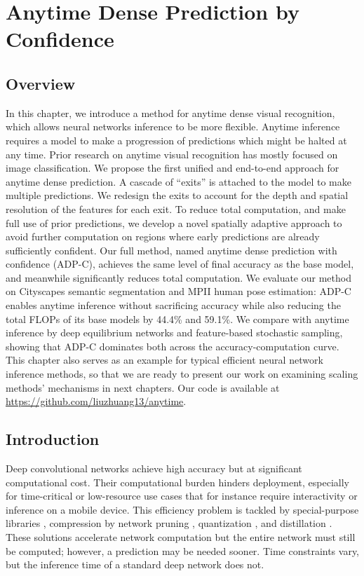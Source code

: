 \chapter{Anytime Dense Prediction by Confidence}
\label{chap:}

\section{Overview}
In this chapter, we introduce a method for anytime dense visual recognition, which allows neural networks inference to be more flexible. Anytime inference requires a model to make a progression of predictions which might be halted at any time. Prior research on anytime visual recognition has mostly focused on image classification. We propose the first unified and end-to-end approach for anytime dense prediction. A cascade of ``exits'' is attached to the model to make multiple predictions. We redesign the exits to account for the depth and spatial resolution of the features for each exit. To reduce total computation, and make full use of prior predictions, we develop a novel spatially adaptive approach to avoid further computation on regions where early predictions are already sufficiently confident. Our full method, named anytime dense prediction with confidence (ADP-C), achieves the same level of final accuracy as the base model, and meanwhile significantly reduces total computation. We evaluate our method on Cityscapes semantic segmentation and MPII human pose estimation: ADP-C enables anytime inference without sacrificing accuracy while also reducing the total FLOPs of its base models by 44.4\% and 59.1\%. We compare with anytime inference by deep equilibrium networks and feature-based stochastic sampling, showing that ADP-C dominates both across the accuracy-computation curve. This chapter also serves as an example for typical efficient neural network inference methods, so that we are ready to present our work on examining scaling methods' mechanisms in next chapters. Our code is available at \url{https://github.com/liuzhuang13/anytime}.

\section{Introduction}
Deep convolutional networks \cite{alexnet,resnet} achieve high accuracy but at significant computational cost.
Their computational burden hinders deployment, especially for time-critical or low-resource use cases that for instance require interactivity or inference on a mobile device.
This efficiency problem is tackled by special-purpose libraries \cite{chetlur2014cudnn}, compression by network pruning
\cite{han2015learning,li2016pruning,liu2019rethinking}, quantization \cite{xnornet,jacob2018quantization}, and distillation \cite{hinton2015distilling,fitnet}.
These solutions accelerate network computation but the entire network must still be computed; however, a prediction may be needed sooner.
Time constraints vary, but the inference time of a standard deep network does not.


